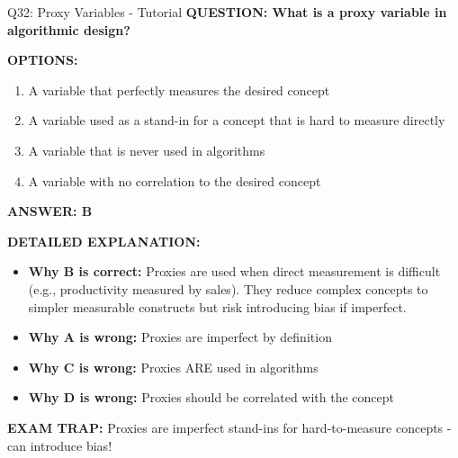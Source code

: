 \documentclass[8pt]{beamer}
\begin{document}
	\begin{frame}{Q32: Proxy Variables - Tutorial}
		\fontsize{6.5}{7.5}\selectfont
		\textbf{QUESTION: What is a proxy variable in algorithmic design?}
		
		\vspace{0.1cm}
		\textbf{OPTIONS:}
		\begin{enumerate}
			\item A variable that perfectly measures the desired concept
			\item A variable used as a stand-in for a concept that is hard to measure directly
			\item A variable that is never used in algorithms
			\item A variable with no correlation to the desired concept
		\end{enumerate}
		
		\vspace{0.1cm}
		\textcolor{myblue}{\textbf{ANSWER: B}}
		
		\vspace{0.1cm}
		\textbf{DETAILED EXPLANATION:}
		\begin{itemize}
			\item \textbf{Why B is correct:} Proxies are used when direct measurement is difficult (e.g., productivity measured by sales). They reduce complex concepts to simpler measurable constructs but risk introducing bias if imperfect.
			\item \textbf{Why A is wrong:} Proxies are imperfect by definition
			\item \textbf{Why C is wrong:} Proxies ARE used in algorithms
			\item \textbf{Why D is wrong:} Proxies should be correlated with the concept
		\end{itemize}
		
		\textcolor{myred}{\textbf{EXAM TRAP:}} Proxies are \textcolor{myblue}{imperfect stand-ins} for hard-to-measure concepts - can introduce bias!
	\end{frame}
	
\end{document}
